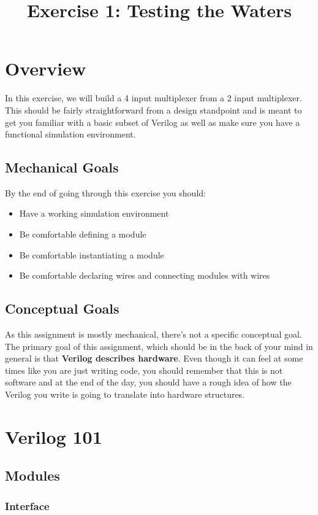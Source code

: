 \documentclass{article}
\begin{document}
\title{Exercise 1: Testing the Waters}
\date{}
\maketitle

\section*{Overview}
In this exercise, we will build a 4 input multiplexer from a 2 input
multiplexer. This should be fairly straightforward from a design standpoint and
is meant to get you familiar with a basic subset of Verilog as well as make sure
you have a functional simulation environment.

\subsection*{Mechanical Goals}
By the end of going through this exercise you should:
\begin{itemize}
    \item Have a working simulation environment
    \item Be comfortable defining a module
    \item Be comfortable instantiating a module
    \item Be comfortable declaring wires and connecting modules with wires 
\end{itemize}

\subsection*{Conceptual Goals}
As this assignment is mostly mechanical, there's not a specific conceptual goal.
The primary goal of this assignment, which should be in the back of your mind in
general is that \textbf{Verilog describes hardware}. Even though it can feel at
some times like you are just writing code, you should remember that this is not
software and at the end of the day, you should have a rough idea of how the
Verilog you write is going to translate into hardware structures. 

\section*{Verilog 101}
\subsection*{Modules}
\subsubsection*{Interface}
\end{document}
